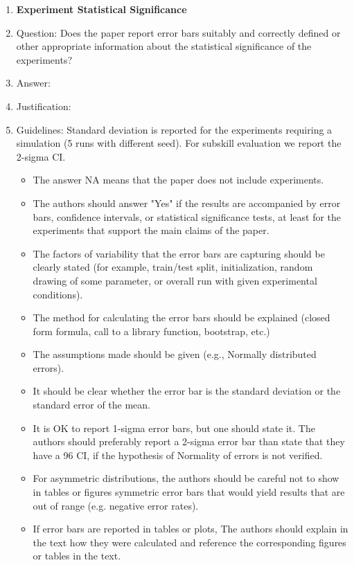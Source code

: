 \documentclass{article}
\begin{document}
\begin{enumerate}
\item {\bf Experiment Statistical Significance}
    \item[] Question: Does the paper report error bars suitably and correctly defined or other appropriate information about the statistical significance of the experiments?
    \item[] Answer: \answerYes{} %
    \item[] Justification: \answerYes{}
    \item[] Guidelines: Standard deviation is reported for the experiments requiring a simulation (5 runs with different seed). For subskill evaluation we report the 2-sigma CI. 
    \begin{itemize}
        \item The answer NA means that the paper does not include experiments.
        \item The authors should answer "Yes" if the results are accompanied by error bars, confidence intervals, or statistical significance tests, at least for the experiments that support the main claims of the paper.
        \item The factors of variability that the error bars are capturing should be clearly stated (for example, train/test split, initialization, random drawing of some parameter, or overall run with given experimental conditions).
        \item The method for calculating the error bars should be explained (closed form formula, call to a library function, bootstrap, etc.)
        \item The assumptions made should be given (e.g., Normally distributed errors).
        \item It should be clear whether the error bar is the standard deviation or the standard error of the mean.
        \item It is OK to report 1-sigma error bars, but one should state it. The authors should preferably report a 2-sigma error bar than state that they have a 96 CI, if the hypothesis of Normality of errors is not verified.
        \item For asymmetric distributions, the authors should be careful not to show in tables or figures symmetric error bars that would yield results that are out of range (e.g. negative error rates).
        \item If error bars are reported in tables or plots, The authors should explain in the text how they were calculated and reference the corresponding figures or tables in the text.
    \end{itemize}


\end{enumerate}
\end{document}
